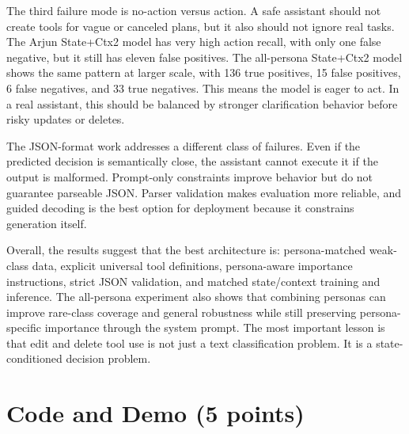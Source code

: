 \documentclass[11pt,a4paper]{article}
\begin{document}
The third failure mode is no-action versus action. A safe assistant should not create tools for vague or canceled plans, but it also should not ignore real tasks. The Arjun State+Ctx2 model has very high action recall, with only one false negative, but it still has eleven false positives. The all-persona State+Ctx2 model shows the same pattern at larger scale, with 136 true positives, 15 false positives, 6 false negatives, and 33 true negatives. This means the model is eager to act. In a real assistant, this should be balanced by stronger clarification behavior before risky updates or deletes.

The JSON-format work addresses a different class of failures. Even if the predicted decision is semantically close, the assistant cannot execute it if the output is malformed. Prompt-only constraints improve behavior but do not guarantee parseable JSON. Parser validation makes evaluation more reliable, and guided decoding is the best option for deployment because it constrains generation itself.

Overall, the results suggest that the best architecture is: persona-matched weak-class data, explicit universal tool definitions, persona-aware importance instructions, strict JSON validation, and matched state/context training and inference. The all-persona experiment also shows that combining personas can improve rare-class coverage and general robustness while still preserving persona-specific importance through the system prompt. The most important lesson is that edit and delete tool use is not just a text classification problem. It is a state-conditioned decision problem.

\section{Code and Demo (5 points)}
\end{document}
